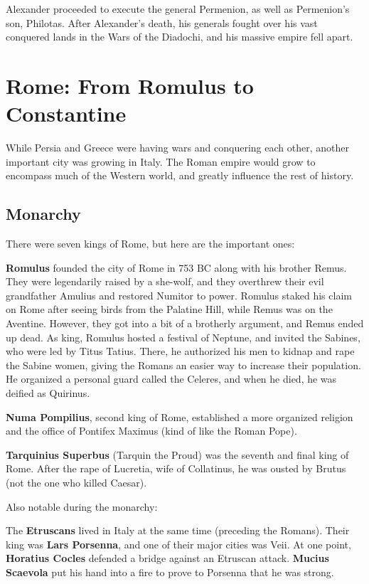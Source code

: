 Alexander proceeded to execute the general Permenion, as well as Permenion's son, Philotas.
After Alexander's death, his generals fought over his vast conquered lands in the Wars of the Diadochi,
and his massive empire fell apart.

\section{Rome: From Romulus to Constantine}

While Persia and Greece were having wars and conquering each other, another important city was growing in Italy.
The Roman empire would grow to encompass much of the Western world,
and greatly influence the rest of history.

\subsection*{Monarchy}

There were seven kings of Rome, but here are the important ones:

\textbf{Romulus} founded the city of Rome in 753 BC along with his brother Remus.
They were legendarily raised by a she-wolf,
and they overthrew their evil grandfather Amulius and restored Numitor to power.
Romulus staked his claim on Rome after seeing birds from the Palatine Hill, while Remus was on the Aventine.
However, they got into a bit of a brotherly argument, and Remus ended up dead.
As king, Romulus hosted a festival of Neptune, and invited the Sabines, who were led by Titus Tatius.
There, he authorized his men to kidnap and rape the Sabine women,
giving the Romans an easier way to increase their population.
He organized a personal guard called the Celeres, and when he died, he was deified as Quirinus.

\textbf{Numa Pompilius}, second king of Rome,
established a more organized religion and the office of Pontifex Maximus (kind of like the Roman Pope).

\textbf{Tarquinius Superbus} (Tarquin the Proud) was the seventh and final king of Rome.
After the rape of Lucretia, wife of Collatinus, he was ousted by Brutus (not the one who killed Caesar).

Also notable during the monarchy:

The \textbf{Etruscans} lived in Italy at the same time (preceding the Romans).
Their king was \textbf{Lars Porsenna}, and one of their major cities was Veii.
At one point, \textbf{Horatius Cocles} defended a bridge against an Etruscan attack.
\textbf{Mucius Scaevola} put his hand into a fire to prove to Porsenna that he was strong.

